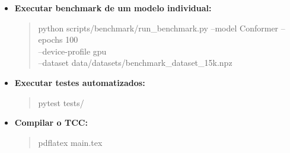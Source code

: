 \documentclass[12pt,a4paper]{article}
\begin{document}
\begin{itemize}
	\item \textbf{Executar benchmark de um modelo individual:}
	\begin{quote}\footnotesize\ttfamily
		python scripts/benchmark/run\_benchmark.py --model Conformer --epochs 100\\
		--device-profile gpu\\
		--dataset data/datasets/benchmark\_dataset\_15k.npz
	\end{quote}
	
	\item \textbf{Executar testes automatizados:}
	\begin{quote}\footnotesize\ttfamily
		pytest tests/
	\end{quote}
	
	\item \textbf{Compilar o TCC:}
	\begin{quote}\footnotesize\ttfamily
		pdflatex main.tex
	\end{quote}
\end{itemize}
\end{document}
